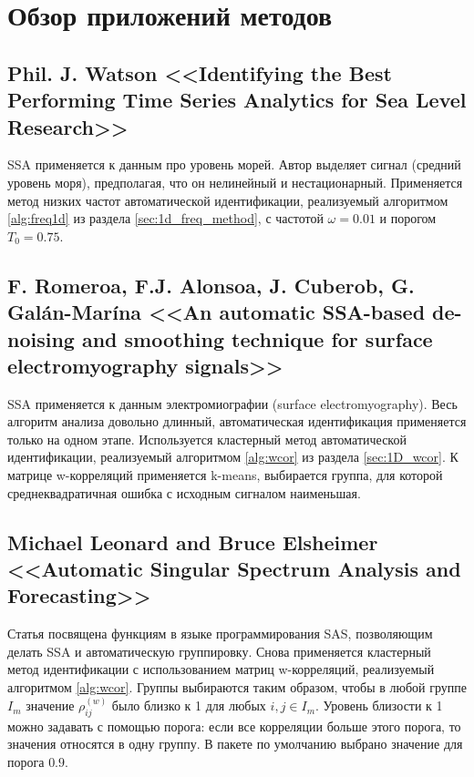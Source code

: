 \documentclass[specialist,
               substylefile = spbu.rtx,
               subf,href,colorlinks=true, 12pt]{disser}
\begin{document}
\section{Обзор приложений методов}

\subsection{Phil. J. Watson <<Identifying the Best Performing Time Series
Analytics for Sea Level Research>> \cite{Watson2016} \cite{Watson2016b}}

SSA применяется к данным  про уровень морей. Автор выделяет сигнал (средний уровень моря), предполагая, что он нелинейный и нестационарный. Применяется метод низких частот автоматической идентификации, реализуемый алгоритмом \ref{alg:freq1d} из раздела \ref{sec:1d_freq_method}, с частотой $\omega=0.01$ и порогом $T_0 = 0.75$.

\subsection{F. Romeroa, F.J. Alonsoa, J. Cuberob, G. Galán-Marína <<An automatic SSA-based de-noising and smoothing technique for surface electromyography signals>>
 \cite{Romeroa2015}}

SSA применяется к данным электромиографии (surface electromyography).
Весь алгоритм анализа довольно длинный, автоматическая идентификация применяется только на одном этапе.
Используется кластерный метод автоматической идентификации, реализуемый алгоритмом \ref{alg:wcor} из раздела \ref{sec:1D_wcor}. К матрице w-корреляций применяется k-means, выбирается группа, для которой среднеквадратичная ошибка с исходным сигналом наименьшая.

\subsection{Michael Leonard and Bruce Elsheimer <<Automatic Singular Spectrum Analysis and Forecasting>>
 \cite{Leonard2017}}

Статья посвящена функциям в языке программирования SAS, позволяющим делать SSA и автоматическую группировку. Снова применяется кластерный метод идентификации  с использованием матриц w-корреляций, реализуемый алгоритмом \ref{alg:wcor}. Группы выбираются таким образом, чтобы в любой группе $I_m$ значение $\rho^{(w)} _{ij}$ было близко к 1 для любых $i, j \in I_m$. Уровень близости к 1 можно задавать с помощью порога: если все корреляции больше этого порога, то значения относятся в одну группу. В пакете по умолчанию выбрано значение для порога $0.9$.
\end{document}
